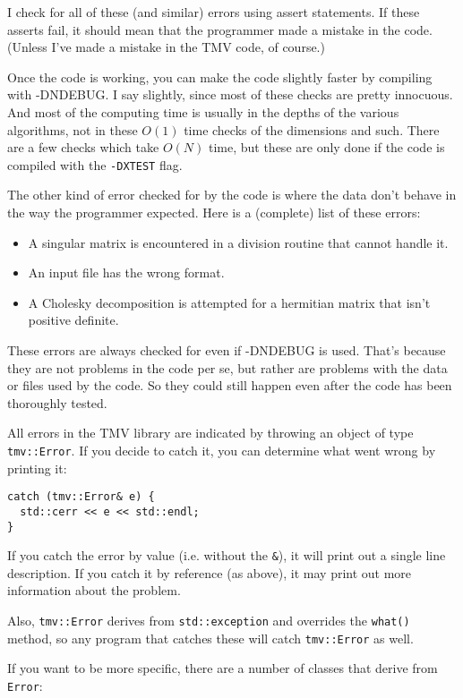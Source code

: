 \documentclass[twoside,letterpaper,11pt]{article}
\renewcommand{\tt}[1]{{\texttt {#1}}}
\begin{document}
I check for all of these (and similar) errors using assert statements.
If these asserts fail, it should mean that
the programmer made a mistake in the code.  (Unless I've made a 
mistake in the TMV code, of course.)

Once the code is working, you can make the code slightly faster by 
compiling with -DNDEBUG.  I say slightly, since most of these checks 
are pretty innocuous.  And most of the computing time is usually in the depths
of the various algorithms, not in these $O(1)$ time checks of the dimensions and such.  
There are a few checks which take $O(N)$ time, but these are only done
if the code is compiled with the \tt{-DXTEST} flag.

The other kind of error checked for by the code is 
where the data don't behave in the way
the programmer expected.  Here is a (complete) list of these errors:
\begin{itemize}
\item
A singular matrix is encountered in a division routine that cannot handle it.
\item
An input file has the wrong format.
\item
A Cholesky decomposition is attempted for a
hermitian matrix that isn't positive definite.
\end{itemize}

These errors are always checked for even if -DNDEBUG is used.
That's because they are not problems in the code per se, but rather
are problems with the data or files used by the code.  So they could
still happen even after the code has been thoroughly tested.

All errors in the TMV library are indicated by throwing an object of type
\tt{tmv::Error}.  If you decide to catch it, you can determine what went
wrong by printing it:
\begin{verbatim}
catch (tmv::Error& e) {
  std::cerr << e << std::endl;
}
\end{verbatim}
If you catch the error by value (i.e. without the \tt{\&}), it will print out
a single line description.  If you catch it by reference (as above), it may 
print out more information about the problem.

Also, \tt{tmv::Error} derives from \tt{std::exception} and overrides the \tt{what()}
method, so any program that catches these will catch \tt{tmv::Error} as well.

If you want to be more specific, there are a number of classes that derive from
\tt{Error}:
\end{document}

